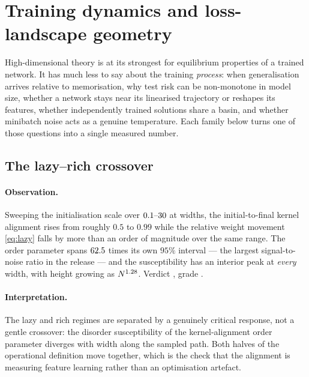 \section{Training dynamics and loss-landscape geometry}
\label{sec:dynamics}

High-dimensional theory is at its strongest for equilibrium properties of a
trained network. It has much less to say about the training \emph{process}:
when generalisation arrives relative to memorisation, why test risk can be
non-monotone in model size, whether a network stays near its linearised
trajectory or reshapes its features, whether independently trained solutions
share a basin, and whether minibatch noise acts as a genuine temperature. Each
family below turns one of those questions into a single measured number.

\subsection{The lazy--rich crossover}


\paragraph{Observation.}
Sweeping the initialisation scale over
$0.1\text{--}30{}$ at \AtlasLazyRichSizes{} widths, the
initial-to-final kernel alignment rises from roughly $0.5$ to $0.99$ while the
relative weight movement \eqref{eq:lazy} falls by more than an order of
magnitude over the same range. The order parameter spans
$62.5{}$ times its own $95\%$ interval --- the largest
signal-to-noise ratio in the release --- and the susceptibility has an interior
peak at \emph{every} width, with height growing as
$N^{1.28{}}$. Verdict
\emph{\AtlasLazyRichVerdict{}}, grade \AtlasLazyRichGrade{}.

\paragraph{Interpretation.}
The lazy and rich regimes are separated by a genuinely critical response, not a
gentle crossover: the disorder susceptibility of the kernel-alignment order
parameter diverges with width along the sampled path. Both halves of the
operational definition move together, which is the check that the alignment is
measuring feature learning rather than an optimisation artefact.

